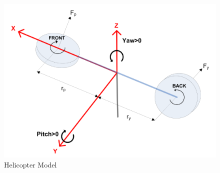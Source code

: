 \begin{figure}[!htbp]
 \begin{center}
  \includegraphics[scale=.75]{figs/img/helicoterModel.png}
 \end{center}
\caption{Helicopter Model}
\label{fig:helicoterModel}
\end{figure}

